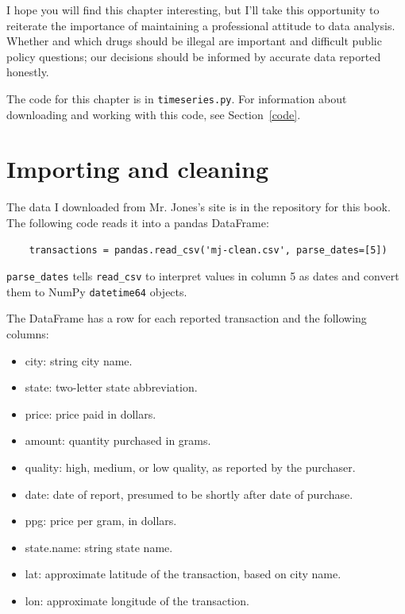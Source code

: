 \documentclass[12pt]{book}
\begin{document}
I hope you will
find this chapter interesting, but I'll take this opportunity to
reiterate the importance of maintaining a professional attitude to
data analysis.  Whether and which drugs should be illegal are
important and difficult public policy questions; our decisions should
be informed by accurate data reported honestly.

The code for this chapter is in {\tt timeseries.py}.  For information
about downloading and working with this code, see Section~\ref{code}.


\section{Importing and cleaning}

The data I downloaded from
Mr. Jones's site is in the repository for this book.
The following code reads it into a
pandas DataFrame:

\begin{verbatim}
    transactions = pandas.read_csv('mj-clean.csv', parse_dates=[5])
\end{verbatim}

\verb"parse_dates" tells \verb"read_csv" to interpret values in column 5
as dates and convert them to NumPy {\tt datetime64} objects.

The DataFrame has a row for each reported transaction and 
the following columns:

\begin{itemize}

\item city: string city name.

\item state: two-letter state abbreviation.

\item price: price paid in dollars.

\item amount: quantity purchased in grams.

\item quality: high, medium, or low quality, as reported by the purchaser.

\item date: date of report, presumed to be shortly after date of purchase.

\item ppg: price per gram, in dollars.

\item state.name: string state name.

\item lat: approximate latitude of the transaction, based on city name.

\item lon: approximate longitude of the transaction.

\end{itemize}
\end{document}

